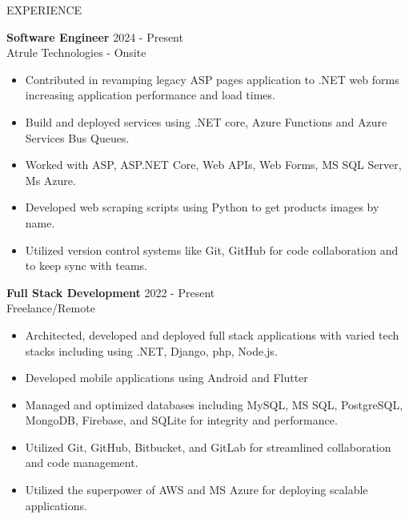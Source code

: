 \documentclass{resume} %
\begin{document}


\begin{rSection}{EXPERIENCE}
	
	\textbf{Software Engineer} \hfill 2024 - Present\\
	Atrule Technologies - Onsite %
	\begin{itemize}
		\itemsep -3pt {} 
		\item Contributed in revamping legacy ASP pages application to .NET web forms increasing application performance and load times.
		\item Build and deployed services using .NET core, Azure Functions and Azure Services Bus Queues.
		\item Worked with ASP, ASP.NET Core, Web APIs, Web Forms, MS SQL Server, Ms Azure.
		
		\item Developed web scraping scripts using Python to get products images by name.
		\item Utilized version control systems like Git, GitHub for code collaboration and to keep sync with teams.
		
	\end{itemize}
	
	\textbf{Full Stack Development} \hfill 2022 - Present\\
	Freelance/Remote %
	\begin{itemize}
		\itemsep -3pt {} 
		\item Architected, developed and deployed full stack applications with varied tech stacks including using .NET, Django, php, Node.js.
		\item Developed mobile applications using Android and Flutter
		\item Managed and optimized databases including MySQL, MS SQL, PostgreSQL, MongoDB, Firebase, and SQLite for integrity and performance. 
		\item Utilized Git, GitHub, Bitbucket, and GitLab for streamlined collaboration and code management.
		\item Utilized the superpower of AWS and MS Azure for deploying scalable applications.
	\end{itemize}
	

\end{rSection}
\end{document}
